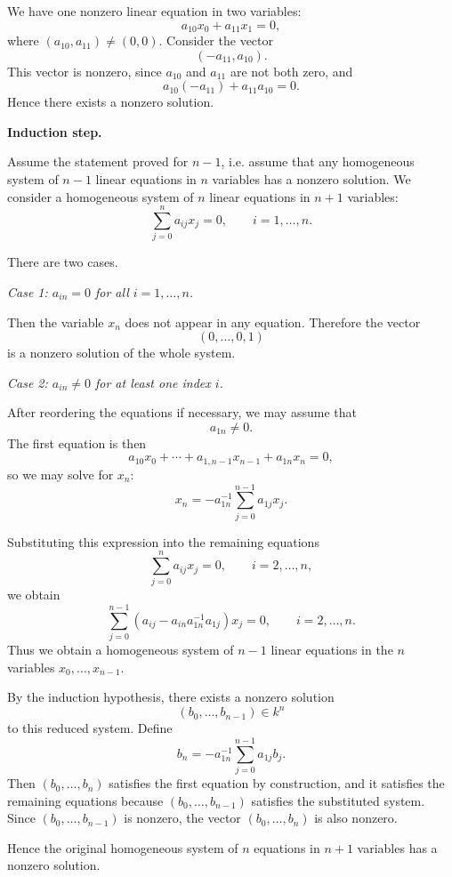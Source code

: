 \documentclass[a4paper,12pt,openany]{article}
\theoremstyle{plain}
\theoremstyle{definition}
\theoremstyle{remark}
\begin{document}
We have one nonzero linear equation in two variables:
\[
a_{10}x_0+a_{11}x_1=0,
\]
where $(a_{10},a_{11})\neq (0,0)$.
Consider the vector
\[
(-a_{11},a_{10}).
\]
This vector is nonzero, since $a_{10}$ and $a_{11}$ are not both zero, and
\[
a_{10}(-a_{11})+a_{11}a_{10}=0.
\]
Hence there exists a nonzero solution.

\medskip

\noindent\textbf{Induction step.}

Assume the statement proved for $n-1$, i.e. assume that any homogeneous
system of $n-1$ linear equations in $n$ variables has a nonzero solution.
We consider a homogeneous system of $n$ linear equations in $n+1$
variables:
\[
\sum_{j=0}^n a_{ij}x_j=0,
\qquad i=1,\dots,n.
\]

There are two cases.

\smallskip

\noindent\emph{Case 1: $a_{in}=0$ for all $i=1,\dots,n$.}

Then the variable $x_n$ does not appear in any equation. Therefore the
vector
\[
(0,\dots,0,1)
\]
is a nonzero solution of the whole system.

\smallskip

\noindent\emph{Case 2: $a_{in}\neq 0$ for at least one index $i$.}

After reordering the equations if necessary, we may assume that
\[
a_{1n}\neq 0.
\]
The first equation is then
\[
a_{10}x_0+\cdots+a_{1,n-1}x_{n-1}+a_{1n}x_n=0,
\]
so we may solve for $x_n$:
\[
x_n=-a_{1n}^{-1}\sum_{j=0}^{n-1}a_{1j}x_j.
\]

Substituting this expression into the remaining equations
\[
\sum_{j=0}^n a_{ij}x_j=0,
\qquad i=2,\dots,n,
\]
we obtain
\[
\sum_{j=0}^{n-1}\left(a_{ij}-a_{in}a_{1n}^{-1}a_{1j}\right)x_j=0,
\qquad i=2,\dots,n.
\]
Thus we obtain a homogeneous system of $n-1$ linear equations in the
$n$ variables $x_0,\dots,x_{n-1}$.

By the induction hypothesis, there exists a nonzero solution
\[
(b_0,\dots,b_{n-1})\in k^n
\]
to this reduced system. Define
\[
b_n=-a_{1n}^{-1}\sum_{j=0}^{n-1}a_{1j}b_j.
\]
Then $(b_0,\dots,b_n)$ satisfies the first equation by construction, and it
satisfies the remaining equations because $(b_0,\dots,b_{n-1})$ satisfies the
substituted system. Since $(b_0,\dots,b_{n-1})$ is nonzero, the vector
$(b_0,\dots,b_n)$ is also nonzero.

Hence the original homogeneous system of $n$ equations in $n+1$ variables
has a nonzero solution.
\end{document}
